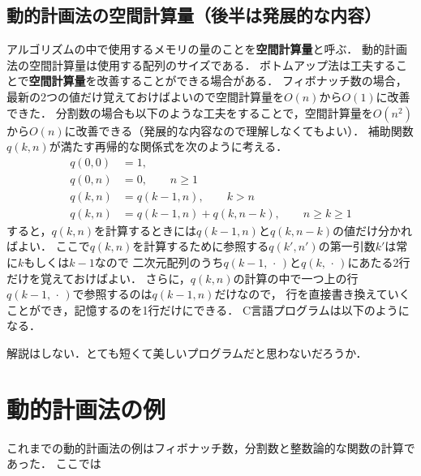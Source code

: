 \documentclass[a4paper,twoside,onecolumn,openany,article]{memoir}
\theoremstyle{remark}
\begin{document}
\subsection{動的計画法の空間計算量（後半は発展的な内容）}\label{sec:space}
アルゴリズムの中で使用するメモリの量のことを\textbf{空間計算量}と呼ぶ．
動的計画法の空間計算量は使用する配列のサイズである．
ボトムアップ法は工夫することで\textbf{空間計算量}を改善することができる場合がある．
フィボナッチ数の場合，最新の2つの値だけ覚えておけばよいので空間計算量を$O(n)$から$O(1)$に改善できた．
分割数の場合も以下のような工夫をすることで，空間計算量を$O(n^2)$から$O(n)$に改善できる（発展的な内容なので理解しなくてもよい）．
補助関数$q(k,n)$が満たす再帰的な関係式を次のように考える．
\begin{align*}
q(0,0) &= 1,\\
q(0,n) &= 0,\qquad n \ge 1\\
q(k,n) &= q(k-1,n),\qquad k > n\\
q(k,n) &= q(k-1,n) + q(k, n-k),\qquad n\ge k\ge 1
\end{align*}
すると，$q(k,n)$を計算するときには$q(k-1,n)$と$q(k,n-k)$の値だけ分かればよい．
ここで$q(k,n)$を計算するために参照する$q(k',n')$の第一引数$k'$は常に$k$もしくは$k-1$なので
二次元配列のうち$q(k-1,\,\cdot\,)$と$q(k,\,\cdot\,)$にあたる2行だけを覚えておけばよい．
さらに，$q(k,n)$の計算の中で一つ上の行$q(k-1,\,\cdot\,)$で参照するのは$q(k-1,n)$だけなので，
行を直接書き換えていくことができ，記憶するのを1行だけにできる．
C言語プログラムは以下のようになる．

解説はしない．とても短くて美しいプログラムだと思わないだろうか．

\section{動的計画法の例}
これまでの動的計画法の例はフィボナッチ数，分割数と整数論的な関数の計算であった．
ここでは
\end{document}
